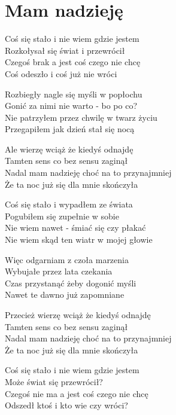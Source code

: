 \section{Mam nadzieję}
\begin{text}
    Coś się stało i nie wiem gdzie jestem\\
    Rozkołysał się świat i przewrócił\\
    Czegoś brak a jest coś czego nie chcę\\
    Coś odeszło i coś już nie wróci

    Rozbiegły nagle się myśli w popłochu\\
    Gonić za nimi nie warto - bo po co?\\
    Nie patrzyłem przez chwilę w twarz życiu\\
    Przegapiłem jak dzień stał się nocą

    Ale wierzę wciąż że kiedyś odnajdę\\
    Tamten sens co bez sensu zaginął\\
    Nadal mam nadzieję choć na to przynajmniej\\
    Że ta noc już się dla mnie skończyła

    Coś się stało i wypadłem ze świata\\
    Pogubiłem się zupełnie w sobie\\
    Nie wiem nawet - śmiać się czy płakać\\
    Nie wiem skąd ten wiatr w mojej głowie

    Więc odgarniam z czoła marzenia\\
    Wybujałe przez lata czekania\\
    Czas przystanąć żeby dogonić myśli\\
    Nawet te dawno już zapomniane

    Przecież wierzę wciąż że kiedyś odnajdę\\
    Tamten sens co bez sensu zaginął\\
    Nadal mam nadzieję choć na to przynajmniej\\
    Że ta noc już się dla mnie skończyła

    Coś się stało i nie wiem gdzie jestem\\
    Może świat się przewrócił?\\
    Czegoś nie ma a jest coś czego nie chcę\\
    Odszedł ktoś i kto wie czy wróci?
\end{text}
